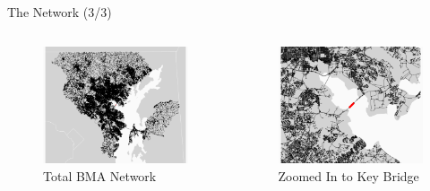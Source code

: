 \documentclass{beamer}
\numberwithin{figure}{section} %
\numberwithin{table}{section} %
\begin{document}
\begin{frame}{The Network (3/3)}
    \begin{columns}
        \begin{column}{0.5\textwidth}
            \begin{figure}
                \centering
                \includegraphics[width=\textwidth]{maps/full_network.png} \\
                {\scriptsize Total BMA Network}
            \end{figure}
        \end{column}

        \begin{column}{0.5\textwidth}
            \begin{figure}
                \centering
                \includegraphics[width=\textwidth]{maps/zoomed_network.png} \\
                {\scriptsize Zoomed In to Key Bridge}
            \end{figure}
        \end{column}
    \end{columns}


\end{frame}
\end{document}
